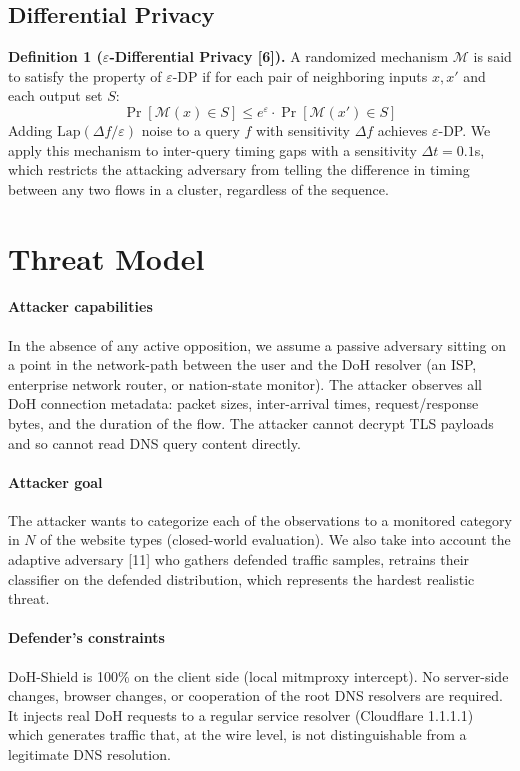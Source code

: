 \documentclass[conference]{IEEEtran}
\begin{document}
\subsection{Differential Privacy}
\textbf{Definition 1 ($\varepsilon$-Differential Privacy [6]).} A randomized mechanism $\mathcal{M}$ is said to satisfy the property of $\varepsilon$-DP if for each pair of neighboring inputs $x, x'$ and each output set $S$:
\begin{equation}
\Pr[\mathcal{M}(x) \in S] \le e^\varepsilon \cdot \Pr[\mathcal{M}(x') \in S]
\end{equation}
Adding $\text{Lap}(\Delta f / \varepsilon)$ noise to a query $f$ with sensitivity $\Delta f$ achieves $\varepsilon$-DP. We apply this mechanism to inter-query timing gaps with a sensitivity $\Delta t = 0.1$s, which restricts the attacking adversary from telling the difference in timing between any two flows in a cluster, regardless of the sequence.

\section{Threat Model}\label{sec:threat}

\paragraph{Attacker capabilities} In the absence of any active opposition, we assume a passive adversary sitting on a point in the network-path between the user and the DoH resolver (an ISP, enterprise network router, or nation-state monitor). The attacker observes all DoH connection metadata: packet sizes, inter-arrival times, request/response bytes, and the duration of the flow. The attacker cannot decrypt TLS payloads and so cannot read DNS query content directly.

\paragraph{Attacker goal} The attacker wants to categorize each of the observations to a monitored category in $N$ of the website types (closed-world evaluation). We also take into account the adaptive adversary [11] who gathers defended traffic samples, retrains their classifier on the defended distribution, which represents the hardest realistic threat.

\paragraph{Defender's constraints} DoH-Shield is 100\% on the client side (local mitmproxy intercept). No server-side changes, browser changes, or cooperation of the root DNS resolvers are required. It injects real DoH requests to a regular service resolver (Cloudflare 1.1.1.1) which generates traffic that, at the wire level, is not distinguishable from a legitimate DNS resolution.
\end{document}
